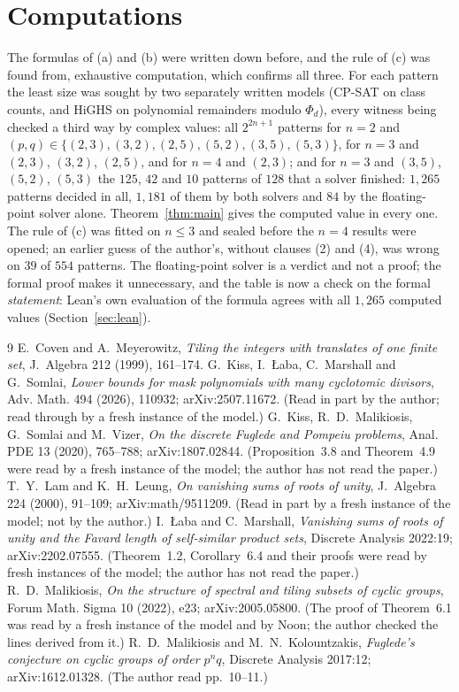 \documentclass[11pt,a4paper]{amsart}
\theoremstyle{definition}
\theoremstyle{remark}
\begin{document}
\section{Computations}\label{sec:computations}

The formulas of (a) and (b) were written down before, and the rule of (c) was found from, exhaustive
computation, which confirms all three. For each pattern the least size was sought by two separately written models (CP-SAT on class counts,
and HiGHS on polynomial remainders modulo $\Phi_d$), every witness being checked a third way by complex
values: all $2^{2n+1}$ patterns for $n=2$ and $(p,q)\in\{(2,3),(3,2),(2,5),(5,2),(3,5),(5,3)\}$, for
$n=3$ and $(2,3)$, $(3,2)$, $(2,5)$, and for $n=4$ and $(2,3)$; and for $n=3$ and $(3,5)$, $(5,2)$,
$(5,3)$ the $125$, $42$ and $10$ patterns of $128$ that a solver finished: $1{,}265$ patterns decided
in all, $1{,}181$ of them by both solvers and $84$ by the floating-point solver alone. Theorem~\ref{thm:main} gives the computed value in every
one. The rule of (c) was fitted on $n\le3$ and sealed before the $n=4$ results were opened; an earlier guess
of the author's, without clauses (2) and (4), was wrong on $39$ of $554$ patterns. The floating-point solver
is a verdict and not a proof; the formal proof makes it unnecessary, and the table is now a check on the
formal \emph{statement}: Lean's own evaluation of the formula agrees with all $1{,}265$ computed values
(Section~\ref{sec:lean}).

\begin{thebibliography}{9}
 E.~Coven and A.~Meyerowitz, \emph{Tiling the integers with translates of one finite set},
 J.~Algebra 212 (1999), 161--174.
 G.~Kiss, I.~{\L}aba, C.~Marshall and G.~Somlai, \emph{Lower bounds for mask polynomials with many
cyclotomic divisors}, Adv. Math. 494 (2026), 110932; arXiv:2507.11672. (Read in part by the author; read
 through by a fresh instance of the model.)
 G.~Kiss, R.~D.~Malikiosis, G.~Somlai and M.~Vizer, \emph{On the discrete Fuglede and Pompeiu
 problems}, Anal. PDE 13 (2020), 765--788; arXiv:1807.02844. (Proposition~3.8 and Theorem~4.9 were read by a
 fresh instance of the model; the author has not read the paper.)
 T.~Y.~Lam and K.~H.~Leung, \emph{On vanishing sums of roots of unity}, J.~Algebra 224 (2000),
 91--109; arXiv:math/9511209. (Read in part by a fresh instance of the model; not by the author.)
 I.~{\L}aba and C.~Marshall, \emph{Vanishing sums of roots of unity and the Favard length of
 self-similar product sets}, Discrete Analysis 2022:19; arXiv:2202.07555. (Theorem~1.2, Corollary~6.4 and
 their proofs were read by fresh instances of the model; the author has not read the paper.)
 R.~D.~Malikiosis, \emph{On the structure of spectral and tiling subsets of cyclic groups}, Forum
 Math. Sigma 10 (2022), e23; arXiv:2005.05800. (The proof of Theorem~6.1 was read by a fresh instance of the
 model and by Noon; the author checked the lines derived from it.)
 R.~D.~Malikiosis and M.~N.~Kolountzakis, \emph{Fuglede's conjecture on cyclic groups of order
 $p^nq$}, Discrete Analysis 2017:12; arXiv:1612.01328. (The author read pp.~10--11.)
\end{thebibliography}
\end{document}
